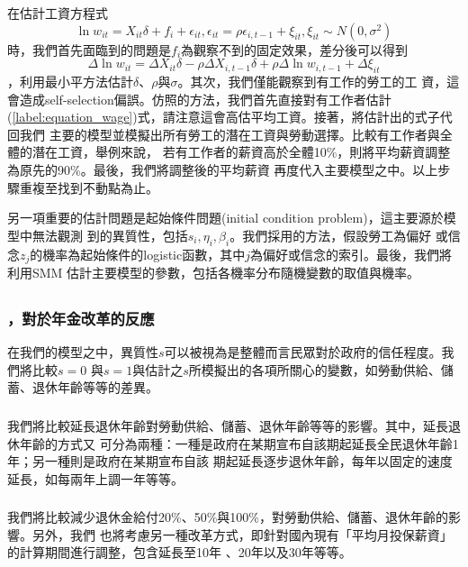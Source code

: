 \documentclass[12pt]{article}
\begin{document}
\begin{CJK*}{UTF8}{bkai}
在估計工資方程式
\begin{equation}
    \ln w_{it} = X_{it}\delta + f_i + \epsilon_{it}, \epsilon_{it} = \rho \epsilon_{i,t-1} + \xi_{it}, \xi_{it} \sim N(0,\sigma^2)
\end{equation}
時，我們首先面臨到的問題是$f_i$為觀察不到的固定效果，差分後可以得到
\begin{equation}\label{label:equation_wage}
    \Delta \ln w_{it} = \Delta X_{it}\delta - \rho \Delta X_{i,t-1} \delta + \rho \Delta \ln w_{i,t-1} + \Delta \xi_{it}
\end{equation}
，利用最小平方法估計$\delta$、$\rho$與$\sigma$。其次，我們僅能觀察到有工作的勞工的工
資，這會造成self-selection偏誤。仿照\cite{french2005}的方法，我們首先直接對有工作者估計
(\ref{label:equation_wage})式，請注意這會高估平均工資。接著，將估計出的式子代回我們
主要的模型並模擬出所有勞工的潛在工資與勞動選擇。比較有工作者與全體的潛在工資，舉例來說，
若有工作者的薪資高於全體10\%，則將平均薪資調整為原先的90\%。最後，我們將調整後的平均薪資
再度代入主要模型之中。以上步驟重複至找到不動點為止。

另一項重要的估計問題是起始條件問題(initial condition problem)，這主要源於模型中無法觀測
到的異質性，包括$s_i,\eta_i,\beta_i$。我們採用\cite{french2011}的方法，假設勞工為偏好
或信念$z_j$的機率為起始條件的logistic函數，其中$j$為偏好或信念的索引。最後，我們將利用SMM
估計主要模型的參數，包括各機率分布隨機變數的取值與機率。

\subsection*{}
\subsubsection*{，對於年金改革的反應}
在我們的模型之中，異質性$s$可以被視為是整體而言民眾對於政府的信任程度。我們將比較$s=0$
與$s=1$與估計之$s$所模擬出的各項所關心的變數，如勞動供給、儲蓄、退休年齡等等的差異。
\subsubsection*{}
我們將比較延長退休年齡對勞動供給、儲蓄、退休年齡等等的影響。其中，延長退休年齡的方式又
可分為兩種：一種是政府在某期宣布自該期起延長全民退休年齡1年；另一種則是政府在某期宣布自該
期起延長逐步退休年齡，每年以固定的速度延長，如每兩年上調一年等等。
\subsubsection*{}
我們將比較減少退休金給付20\%、50\%與100\%，對勞動供給、儲蓄、退休年齡的影響。另外，我們
也將考慮另一種改革方式，即針對國內現有「平均月投保薪資」的計算期間進行調整，包含延長至10年
、20年以及30年等等。


\end{CJK*}
\end{document}
